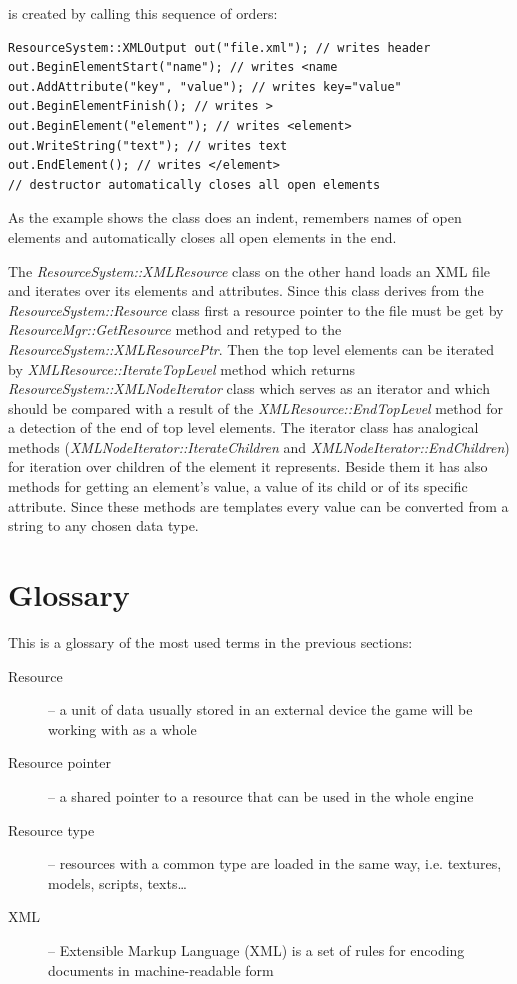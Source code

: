 \documentclass[a4paper, 12pt]{report}
\begin{document}
\noindent is created by calling this sequence of orders:

\begin{verbatim}
ResourceSystem::XMLOutput out("file.xml"); // writes header
out.BeginElementStart("name"); // writes <name
out.AddAttribute("key", "value"); // writes key="value"
out.BeginElementFinish(); // writes >
out.BeginElement("element"); // writes <element>
out.WriteString("text"); // writes text
out.EndElement(); // writes </element>
// destructor automatically closes all open elements
\end{verbatim}

\noindent As the example shows the class does an indent, remembers names of open elements and automatically closes all open elements in the end.

The \emph{ResourceSystem::XMLResource} class on the other hand loads an XML file and iterates over its elements and attributes. Since this class derives from the \emph{ResourceSystem::Resource} class first a resource pointer to the file must be get by \emph{ResourceMgr::GetResource} method and retyped to the \emph{ResourceSystem::XMLResourcePtr}. Then the top level elements can be iterated by \emph{XMLResource::IterateTopLevel} method which returns \emph{ResourceSystem::XMLNodeIterator} class which serves as an iterator and which should be compared with a result of the \emph{XMLResource::EndTopLevel} method for a detection of the end of top level elements. The iterator class has analogical methods (\emph{XMLNodeIterator::IterateChildren} and \emph{XMLNodeIterator::EndChildren}) for iteration over children of the element it represents. Beside them it has also methods for getting an element's value, a value of its child or of its specific attribute. Since these methods are templates every value can be converted from a string to any chosen data type.

\section{Glossary}
This is a glossary of the most used terms in the previous sections:

\begin{description}
  \item[Resource] -- a unit of data usually stored in an external device the game will be working with as a whole
  \item[Resource pointer] -- a shared pointer to a resource that can be used in the whole engine
  \item[Resource type] -- resources with a common type are loaded in the same way, i.e. textures, models, scripts, texts\ldots
  \item[XML] -- Extensible Markup Language (XML) is a set of rules for encoding documents in machine-readable form
\end{description}
\end{document}
